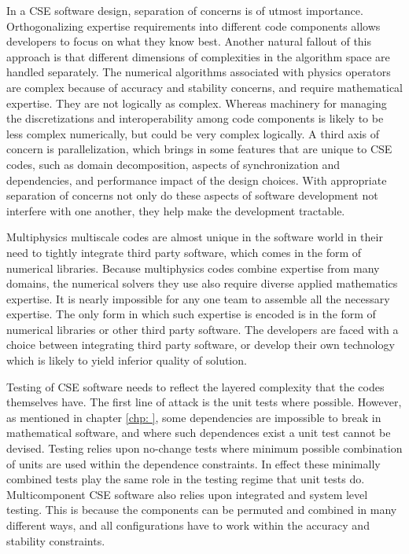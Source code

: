 In a CSE software design, separation of concerns is of utmost
importance. Orthogonalizing expertise requirements into different code
components allows developers to focus on what they know best.  
Another natural fallout of this approach is that different dimensions of
complexities in the algorithm space are handled separately. The
numerical algorithms associated with physics operators are complex
because of accuracy and stability concerns, and require mathematical
expertise. They are not logically as complex. Whereas machinery for
managing the discretizations and interoperability among code
components is likely to be less complex numerically, but could be very
complex logically. A third axis of concern is parallelization, which
brings in some features that are unique to CSE codes, such as domain
decomposition, aspects of synchronization and dependencies, and
performance impact of the design choices. With appropriate separation
of concerns not only do these aspects of software development not 
interfere with one another, they help make the development tractable. 

Multiphysics multiscale codes are almost unique in the software world
in their need to tightly integrate third party software, which comes
in the form of numerical libraries. Because multiphysics codes combine
expertise from many domains, the numerical solvers they use also
require diverse applied mathematics expertise. It is nearly impossible
for any one team to assemble all the necessary expertise. The only
form in which such expertise is encoded is in the form of numerical
libraries or other third party software. The developers are faced with
a choice between integrating third party software, or develop their
own technology which is likely to yield inferior quality of solution. 

Testing of CSE software needs to reflect the layered complexity that
the codes themselves have. The first line of attack is the unit tests
where possible. However, as mentioned in chapter \ref{chp: }, some
dependencies are impossible to break in mathematical software, and
where such dependences exist a unit test cannot be devised. Testing
relies upon no-change tests where minimum possible combination of
units are used within the dependence constraints. In effect these
minimally combined tests play the same role in the testing regime that
unit tests do. Multicomponent CSE software also relies upon integrated
and system level testing. This is because the components can be
permuted and combined in many different ways, and all configurations
have to work within the accuracy and stability constraints. 

